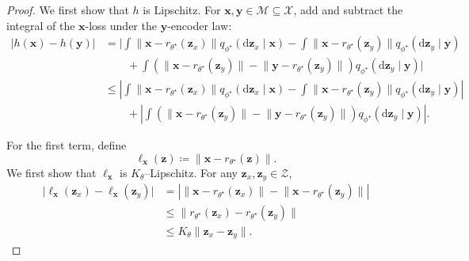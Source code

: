 \documentclass[10pt,a4paper]{amsart}
\begin{document}
\begin{proof}
We first show that $h$ is Lipschitz.  For $\mathbf{x},\mathbf{y}\in\mathcal{M}\subseteq\mathcal{X}$, add and subtract the integral of the $\mathbf{x}$-loss under the $\mathbf{y}$-encoder law:
\begin{align*}
\bigl|h(\mathbf{x})-h(\mathbf{y})\bigr|
&=
\Bigg|
\int
  \bigl\|\mathbf{x}-r_{\theta^\star}(\mathbf{z}_x)\bigr\|
  q_{\phi^\star}
    (\mathrm{d}\mathbf{z}_x\mid\mathbf{x})
-
\int
  \bigl\|\mathbf{x}-r_{\theta^\star}(\mathbf{z}_y)\bigr\|
  q_{\phi^\star}
    (\mathrm{d}\mathbf{z}_y\mid\mathbf{y})
\\
&\qquad
+
\int
  \left(
    \bigl\|\mathbf{x}-r_{\theta^\star}(\mathbf{z}_y)\bigr\|
    -
    \bigl\|\mathbf{y}-r_{\theta^\star}(\mathbf{z}_y)\bigr\|
  \right)
  q_{\phi^\star}
    (\mathrm{d}\mathbf{z}_y\mid\mathbf{y})
\Bigg|
\\
&\leq
\left|
\int
  \bigl\|\mathbf{x}-r_{\theta^\star}(\mathbf{z}_x)\bigr\|
  q_{\phi^\star}
    (\mathrm{d}\mathbf{z}_x\mid\mathbf{x})
-
\int
  \bigl\|\mathbf{x}-r_{\theta^\star}(\mathbf{z}_y)\bigr\|
  q_{\phi^\star}
    (\mathrm{d}\mathbf{z}_y\mid\mathbf{y})
\right|
\\
&\qquad
+
\left|
\int
  \left(
    \bigl\|\mathbf{x}-r_{\theta^\star}(\mathbf{z}_y)\bigr\|
    -
    \bigl\|\mathbf{y}-r_{\theta^\star}(\mathbf{z}_y)\bigr\|
  \right)
  q_{\phi^\star}
    (\mathrm{d}\mathbf{z}_y\mid\mathbf{y})
\right|.
\end{align*}

For the first term, define
\[
  \ell_{\mathbf{x}}(\mathbf{z})
  \coloneqq
  \bigl\|\mathbf{x}-r_{\theta^\star}(\mathbf{z})\bigr\|.
\]
We first show that $\ell_{\mathbf{x}}$ is $K_\theta$--Lipschitz. For any $\mathbf{z}_x,\mathbf{z}_y\in\mathcal{Z}$,
\begin{align*}
\bigl|
  \ell_{\mathbf{x}}(\mathbf{z}_x)
  -
  \ell_{\mathbf{x}}(\mathbf{z}_y)
\bigr|
&=
\left|
  \bigl\|\mathbf{x}-r_{\theta^\star}(\mathbf{z}_x)\bigr\|
  -
  \bigl\|\mathbf{x}-r_{\theta^\star}(\mathbf{z}_y)\bigr\|
\right|
\\
&\leq
\bigl\|
  r_{\theta^\star}(\mathbf{z}_x)
  -
  r_{\theta^\star}(\mathbf{z}_y)
\bigr\|
\\
&\leq
K_\theta\bigl\|\mathbf{z}_x-\mathbf{z}_y\bigr\|.
\end{align*}


\end{proof}
\end{document}
